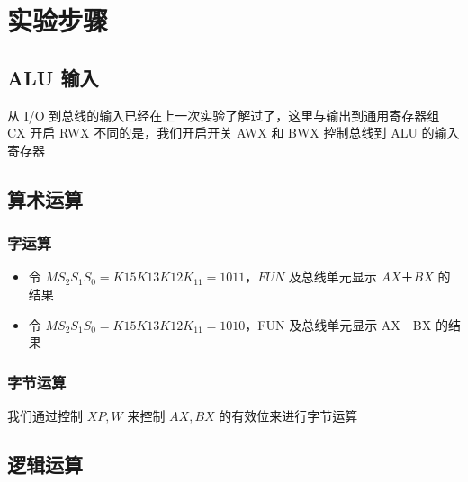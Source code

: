 \documentclass[a4paper,10pt,UTF8]{paper}
\numberwithin{equation}{section}
\numberwithin{figure}{section}
\begin{document}
\section{实验步骤}

\subsection{ ALU 输入 }

从 I/O 到总线的输入已经在上一次实验了解过了，这里与输出到通用寄存器组 CX 开启 RWX 不同的是，我们开启开关 AWX 和 BWX 控制总线到 ALU 的输入寄存器


  

\subsection{算术运算}

\subsubsection{字运算}

\begin{itemize}
  \item 令 $MS_2S_1S_0=K{15}K{13}K{12}K_{11}=1011$，$FUN$ 及总线单元显示 $AX＋BX$ 的结果
  \item 令 $MS_2S_1S_0=K{15}K{13}K{12}K_{11}=1010$，FUN 及总线单元显示 AX－BX 的结果

\end{itemize}

\subsubsection{字节运算}

我们通过控制 $XP,W$ 来控制 $AX, BX$ 的有效位来进行字节运算


\subsection{逻辑运算}
\end{document}

